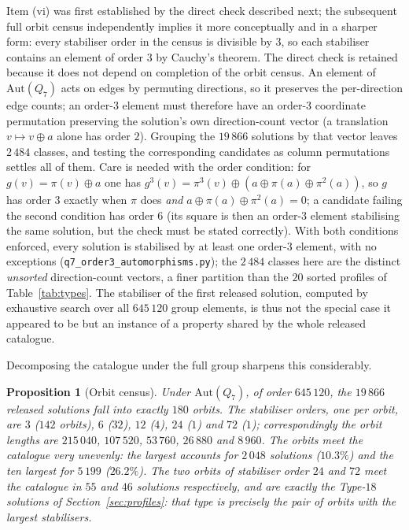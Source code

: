 \documentclass[12pt,a4paper]{article}
\newtheorem{proposition}[theorem]{Proposition}
\theoremstyle{definition}
\begin{document}
Item (vi) was first established by the direct check described next; the
subsequent full orbit census independently implies it more conceptually and in
a sharper form: every stabiliser order in the census is divisible by
$3$, so each stabiliser contains an element of order $3$ by Cauchy's
theorem. The direct check is retained because it does not depend on
completion of the orbit census. An element of
$\mathrm{Aut}(Q_7)$ acts on edges by permuting directions, so it preserves the
per-direction edge counts; an order-$3$ element must therefore have an order-$3$
coordinate permutation preserving the solution's own direction-count vector
(a translation $v\mapsto v\oplus a$ alone has order $2$). Grouping the $19\,866$
solutions by that vector leaves $2\,484$ classes, and testing the corresponding
candidates as column permutations settles all of them. Care is needed with
the order condition: for $g(v)=\pi(v)\oplus a$ one has
$g^3(v)=\pi^3(v)\oplus(a\oplus\pi(a)\oplus\pi^2(a))$, so $g$ has order $3$
exactly when $\pi$ does \emph{and} $a\oplus\pi(a)\oplus\pi^2(a)=0$; a
candidate failing the second condition has order $6$ (its square is then an
order-$3$ element stabilising the same solution, but the check must be stated
correctly). With both conditions enforced, every solution is stabilised by at
least one order-$3$ element, with no exceptions
(\texttt{q7\_order3\_automorphisms.py}); the $2\,484$ classes here are the
distinct \emph{unsorted} direction-count vectors, a finer partition than the
$20$ sorted profiles of Table~\ref{tab:types}. The stabiliser of the first
released solution, computed by exhaustive search over
all $645\,120$ group elements, is thus not the special case it appeared to be but
an instance of a property shared by the whole released catalogue.

Decomposing the catalogue under the full group sharpens this considerably.

\begin{proposition}[Orbit census]\label{prop:orbits}
Under $\mathrm{Aut}(Q_7)$, of order $645\,120$, the $19\,866$ released
solutions fall into exactly $180$ orbits. The stabiliser orders, one per orbit,
are $3$ ($142$ orbits), $6$ ($32$), $12$ ($4$), $24$ ($1$) and $72$ ($1$);
correspondingly the orbit lengths are $215\,040$, $107\,520$, $53\,760$,
$26\,880$ and $8\,960$. The orbits meet the catalogue very unevenly: the
largest accounts for $2\,048$ solutions ($10.3\%$) and the ten largest for
$5\,199$ ($26.2\%$). The two orbits of stabiliser order $24$ and $72$ meet the
catalogue in $55$ and $46$ solutions respectively, and are exactly the
Type-$18$ solutions of Section~\ref{sec:profiles}: that type is precisely the
pair of orbits with the largest stabilisers.
\end{proposition}
\end{document}
